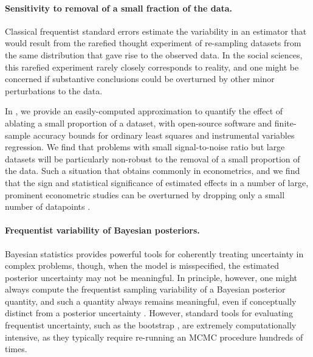 \paragraph{Sensitivity to removal of a small fraction of the data.} Classical
frequentist standard errors estimate the variability in an estimator that would
result from the rarefied thought experiment of re-sampling datasets from the same
distribution that gave rise to the observed data.  In the social sciences, this
rarefied experiment rarely closely corresponds to reality, and one might be
concerned if substantive conclusions could be overturned by other minor
perturbations to the data.

In \citet{giordano:2020:amip}, we provide an easily-computed approximation to
quantify the effect of ablating a small proportion of a dataset, with
open-source software and finite-sample accuracy bounds for ordinary least
squares and instrumental variables regression. We find that problems with small
signal-to-noise ratio but large datasets will be particularly non-robust to the
removal of a small proportion of the data. Such a situation that obtains
commonly in econometrics, and we find that the sign and statistical significance
of estimated effects in a number of large, prominent econometric studies can be
overturned by dropping only a small number of datapoints
\citep{angelucci:2009:indirect, finkelstein:2012:oregon, meager:2019:microcredit}.


\paragraph{Frequentist variability of Bayesian posteriors.}

Bayesian statistics provides powerful tools for coherently treating uncertainty
in complex problems, though, when the model is misspecified, the estimated
posterior uncertainty may not be meaningful.  In principle, however, one might
always compute the frequentist sampling variability of a Bayesian posterior
quantity, and such a quantity always remains meaningful, even if conceptually
distinct from a posterior uncertainty \citep{waddell:2002:bayesphyloboot,
kleijn:2006:misspecification}.  However, standard tools for evaluating
frequentist uncertainty, such as the bootstrap \citep{huggins:2019:bayesbag},
are extremely computationally intensive, as they typically require re-running an
MCMC procedure hundreds of times.


